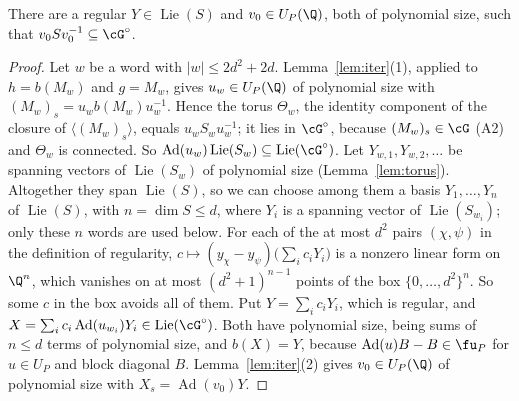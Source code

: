 \begin{lemma}\label{lem:v0}
There are a regular $Y\in\operatorname{Lie}(S)$ and $v_0\in U_P(\Q)$, both of polynomial size, such that
$v_0Sv_0^{-1}\subseteq\cG^\circ$.
\end{lemma}
\begin{proof}
Let $w$ be a word with $|w|\le2d^2+2d$. Lemma~\ref{lem:iter}(1), applied to $h=b(M_w)$ and $g=M_w$,
gives $u_w\in U_P(\Q)$ of polynomial size with $(M_w)_s=u_wb(M_w)u_w^{-1}$. Hence the torus
$\Theta_w$, the identity component of the closure of $\langle(M_w)_s\rangle$, equals $u_wS_wu_w^{-1}$;
it lies in $\cG^\circ$, because $(M_w)_s\in\cG$ (A2) and $\Theta_w$ is connected. So
$\operatorname{Ad}(u_w)\operatorname{Lie}(S_w)\subseteq\operatorname{Lie}(\cG^\circ)$. Let $Y_{w,1},Y_{w,2},\ldots$ be spanning vectors of
$\operatorname{Lie}(S_w)$ of polynomial size (Lemma~\ref{lem:torus}). Altogether they span $\operatorname{Lie}(S)$, so we can choose
among them a basis $Y_1,\ldots,Y_n$ of $\operatorname{Lie}(S)$, with $n=\dim S\le d$, where $Y_i$ is a spanning vector of
$\operatorname{Lie}(S_{w_i})$; only these $n$ words are used below. For each of the at most $d^2$ pairs $(\chi,\psi)$ in the definition of regularity,
$c\mapsto(y_\chi-y_\psi)\bigl(\sum_i c_iY_i\bigr)$ is a nonzero linear form on $\Q^n$, which
vanishes on at most $(d^2+1)^{n-1}$ points of the box $\{0,\ldots,d^2\}^n$. So some $c$ in the box
avoids all of them. Put $Y=\sum_ic_iY_i$, which is regular, and
$X=\sum_ic_i\operatorname{Ad}(u_{w_i})Y_i\in\operatorname{Lie}(\cG^\circ)$. Both have polynomial size, being sums of $n\le d$ terms of
polynomial size, and $b(X)=Y$, because
$\operatorname{Ad}(u)B-B\in\fu_P$ for $u\in U_P$ and block diagonal $B$. Lemma~\ref{lem:iter}(2) gives
$v_0\in U_P(\Q)$ of polynomial size with $X_s=\operatorname{Ad}(v_0)Y$.


\end{proof}
